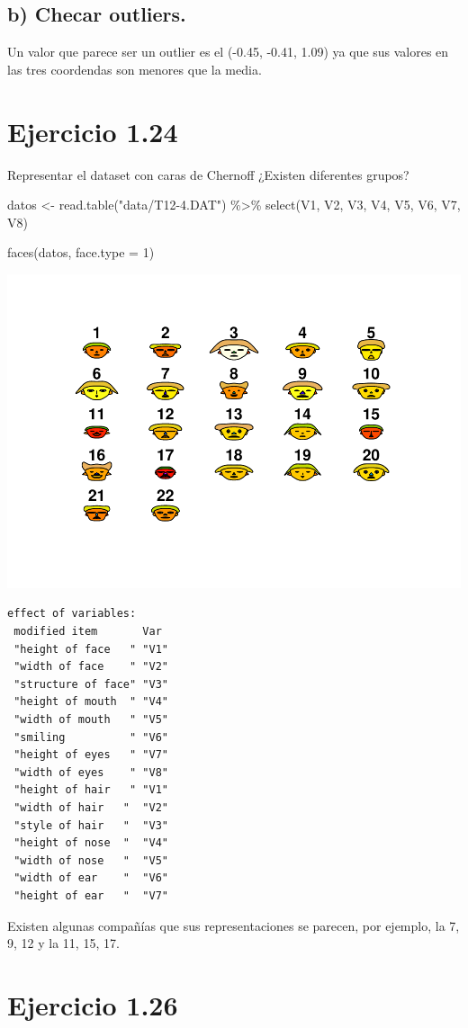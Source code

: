 \documentclass[
]{article}
\newenvironment{Shaded}{\begin{snugshade}}{\end{snugshade}}
\newcommand{\AttributeTok}[1]{\textcolor[rgb]{0.77,0.63,0.00}{#1}}
\newcommand{\DecValTok}[1]{\textcolor[rgb]{0.00,0.00,0.81}{#1}}
\newcommand{\FunctionTok}[1]{\textcolor[rgb]{0.00,0.00,0.00}{#1}}
\newcommand{\NormalTok}[1]{#1}
\newcommand{\OtherTok}[1]{\textcolor[rgb]{0.56,0.35,0.01}{#1}}
\newcommand{\SpecialCharTok}[1]{\textcolor[rgb]{0.00,0.00,0.00}{#1}}
\newcommand{\StringTok}[1]{\textcolor[rgb]{0.31,0.60,0.02}{#1}}
\begin{document}
\hypertarget{b-checar-outliers.}{%
\subsection{b) Checar outliers.}\label{b-checar-outliers.}}

Un valor que parece ser un outlier es el (-0.45, -0.41, 1.09) ya que sus
valores en las tres coordendas son menores que la media.

\hypertarget{ejercicio-1.24}{%
\section{Ejercicio 1.24}\label{ejercicio-1.24}}

Representar el dataset con caras de Chernoff ¿Existen diferentes grupos?

\begin{Shaded}
\begin{Highlighting}[]
\NormalTok{datos }\OtherTok{\textless{}{-}} \FunctionTok{read.table}\NormalTok{(}\StringTok{"data/T12{-}4.DAT"}\NormalTok{) }\SpecialCharTok{\%\textgreater{}\%} \FunctionTok{select}\NormalTok{(V1, V2, V3, V4, V5, V6, V7, V8)}

\FunctionTok{faces}\NormalTok{(datos, }\AttributeTok{face.type =} \DecValTok{1}\NormalTok{)}
\end{Highlighting}
\end{Shaded}

\includegraphics{Tarea1_files/figure-latex/unnamed-chunk-26-1.pdf}

\begin{verbatim}
effect of variables:
 modified item       Var 
 "height of face   " "V1"
 "width of face    " "V2"
 "structure of face" "V3"
 "height of mouth  " "V4"
 "width of mouth   " "V5"
 "smiling          " "V6"
 "height of eyes   " "V7"
 "width of eyes    " "V8"
 "height of hair   " "V1"
 "width of hair   "  "V2"
 "style of hair   "  "V3"
 "height of nose  "  "V4"
 "width of nose   "  "V5"
 "width of ear    "  "V6"
 "height of ear   "  "V7"
\end{verbatim}

Existen algunas compañías que sus representaciones se parecen, por
ejemplo, la 7, 9, 12 y la 11, 15, 17.

\hypertarget{ejercicio-1.26}{%
\section{Ejercicio 1.26}\label{ejercicio-1.26}}
\end{document}
